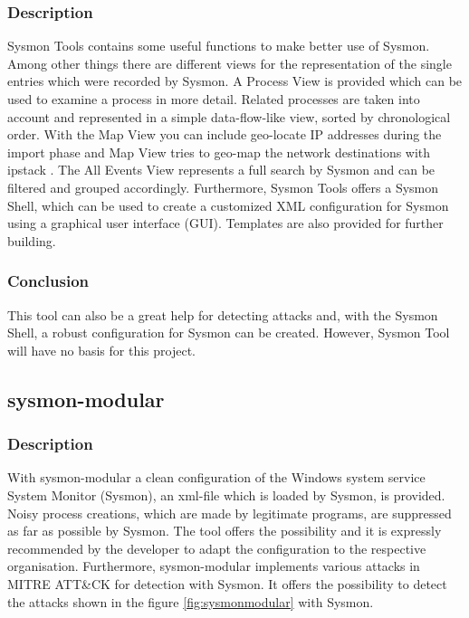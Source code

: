 \subsubsection{Description}
Sysmon Tools \cite{SysmonTools} contains some useful functions to make better use of Sysmon. Among other things there are different views for the representation of the single entries which were recorded by Sysmon. A Process View is provided which can be used to examine a process in more detail. Related processes are taken into account and represented in a simple data-flow-like view, sorted by chronological order. With the Map View you can include geo-locate IP addresses during the import phase and Map View tries to geo-map the network destinations with ipstack \cite{ipstack}. The All Events View represents a full search by Sysmon and can be filtered and grouped accordingly. Furthermore, Sysmon Tools offers a Sysmon Shell, which can be used to create a customized XML configuration for Sysmon using a graphical user interface (GUI). Templates are also provided for further building.
\subsubsection{Conclusion}
This tool can also be a great help for detecting attacks and, with the Sysmon Shell, a robust configuration for Sysmon can be created. However, Sysmon Tool will have no basis for this project.

\clearpage

\subsection{sysmon-modular}
\subsubsection{Description}
With sysmon-modular \cite{sysmon-modular} a clean configuration of the Windows system service System Monitor (Sysmon), an xml-file which is loaded by Sysmon, is provided. Noisy process creations, which are made by legitimate programs, are suppressed as far as possible by Sysmon. The tool offers the possibility and it is expressly recommended by the developer to adapt the configuration to the respective organisation. Furthermore, sysmon-modular implements various attacks in MITRE ATT\&CK for detection with Sysmon. It offers the possibility to detect the attacks shown in the figure \ref{fig:sysmonmodular} with Sysmon.


